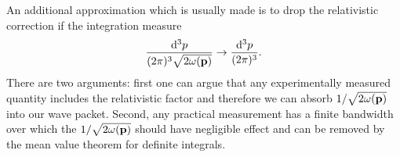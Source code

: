 An additional approximation which is usually made is to drop the relativistic correction if the integration measure
\begin{equation*}
	\frac{\dd[3]{p}}{(2\pi)^3\sqrt{2\omega(\vb{p})}}
	\to
	\frac{\dd[3]{p}}{(2\pi)^3}
	.
\end{equation*}
There are two arguments: first one can argue that any experimentally measured quantity includes the relativistic factor and therefore we can absorb $1/\sqrt{2\omega(\vb{p})}$ into our wave packet.
Second, any practical measurement has a finite bandwidth over which the $1/\sqrt{2\omega(\vb{p})}$ should have negligible effect and can be removed by the mean value theorem for definite integrals.